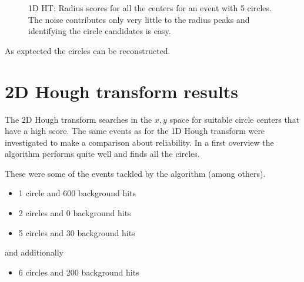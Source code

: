 \documentclass[11pt,twoside]{scrreprt}
\begin{document}
\begin{figure}[htbp]
\centering
  

  \caption{1D HT: Radius scores for all the centers for an event with 5 circles. The noise contributes only very little to the radius peaks
  and identifying the circle candidates is easy.}
  \label{fig:5_circles_30_bg_radius}
\end{figure}
As exptected the circles can be reconstructed.



\newpage
\section{2D Hough transform results} %
\label{sec:2d_hough_transform_results}
The 2D Hough transform searches in the $x,y$ space for suitable
circle centers that have a high score. The same events as for the 1D
Hough transform were investigated to make a comparison about reliability.
In a first overview the algorithm performs quite well and finds all the
circles.

These were some of the events tackled by the algorithm (among others).
\begin{itemize}
  \item 1 circle and 600 background hits
  \item 2 circles and 0 background hits
  \item 5 circles and 30 background hits
\end{itemize} 
and additionally
\begin{itemize}
  \item 6 circles and 200 background hits
\end{itemize}
\end{document}
